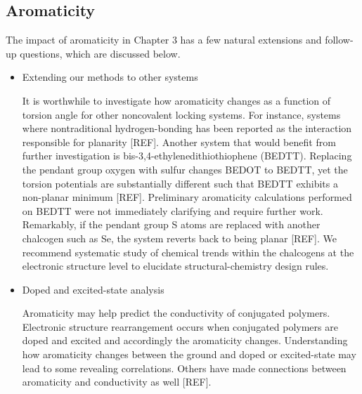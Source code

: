 \subsection{Aromaticity}

The impact of aromaticity in Chapter 3 has a few natural extensions and follow-up questions, which are discussed below.

\begin{itemize}
  \item Extending our methods to other systems

  It is worthwhile to investigate how aromaticity changes as a function of torsion angle for other noncovalent locking systems. For instance, systems where nontraditional hydrogen-bonding has been reported as the interaction responsible for planarity [REF]. Another system that would benefit from further investigation is bis-3,4-ethylenedithiothiophene (BEDTT). Replacing the pendant group oxygen with sulfur changes BEDOT to BEDTT, yet the torsion potentials are substantially different such that BEDTT exhibits a non-planar minimum [REF]. Preliminary aromaticity calculations performed on BEDTT were not immediately clarifying and require further work. Remarkably, if the pendant group S atoms are replaced with another chalcogen such as Se, the system reverts back to being planar [REF]. We recommend systematic study of chemical trends within the chalcogens at the electronic structure level to elucidate structural-chemistry design rules.

  \item Doped and excited-state analysis

  Aromaticity may help predict the conductivity of conjugated polymers. Electronic structure rearrangement occurs when conjugated polymers are doped and excited and accordingly the aromaticity changes. Understanding how aromaticity changes between the ground and doped or excited-state may lead to some revealing correlations. Others have made connections between aromaticity and conductivity as well [REF].

\end{itemize}
